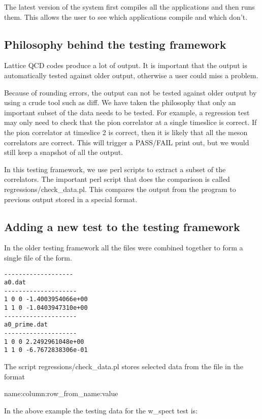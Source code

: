 \documentclass[12pt]{article}
\begin{document}
The latest version of the system first compiles all the 
applications and then runs them. This allows the user to
see which applications compile and which don't.


\subsection{Philosophy behind the testing framework}

Lattice QCD codes produce a lot of output. It is important that the 
output is automatically tested against older output, otherwise
a user could miss a problem.

Because of rounding errors, the output can not be tested against older
output by using a crude tool such as diff. We have taken the
philosophy that only an important subset of the data needs to be
tested. For example, a regression test may only need to check that the
pion correlator at a single timeslice is correct. If the pion
correlator at timeslice 2 is correct, then it is likely that all the
meson correlators are correct. This will trigger a PASS/FAIL
print out, but we would still keep a snapshot of all the output.

In this testing framework, we use perl scripts to
extract a subset of the correlators. The important
perl script that does the comparison is called
regressions/check\_data.pl. This compares the output from
the program to previous output stored in a special format.



\subsection{Adding a new test to the testing framework}

In the older testing framework all the files were 
combined together to form a single file of the form.

\begin{verbatim}
-------------------
a0.dat
--------------------
1 0 0 -1.4003954066e+00
1 1 0 -1.0403947310e+00
--------------------
a0_prime.dat
--------------------
1 0 0 2.2492961048e+00
1 1 0 -6.7672838306e-01
\end{verbatim}

The script regressions/check\_data.pl stores selected data
from the file in the format
\begin{center}
name:column:row\_from\_name:value
\end{center}
In the above example the testing data for the w\_spect
test is:
\end{document}
